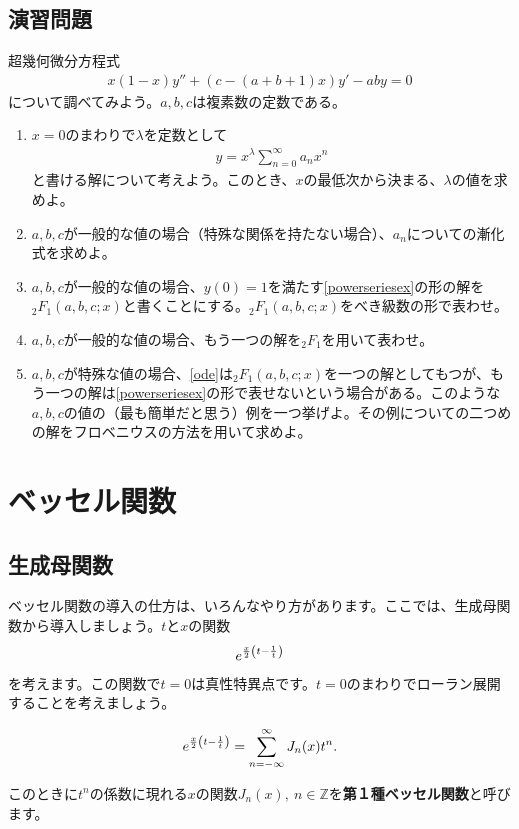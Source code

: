 \documentclass[report,paper=a4, fontsize=12pt, line_length=16cm, number_of_lines=33,dvipdfmx]{jlreq}
\newenvironment{important}{\begin{tcolorbox}[
  colback = white,
  colframe = red!35,
  boxrule = 2mm,
  fonttitle = \bfseries,
  after = \noindent] }{\end{tcolorbox}}
\numberwithin{equation}{section}
\newcommand{\Zb}{\mathbb{Z}}
\newcommand{\strong}[1]{\textsf{\bfseries #1}}
\newcommand{\HG}{{}_2F_1}
\begin{document}
\section{演習問題}\label{ex:hypergeometric}
超幾何微分方程式
\begin{align}
  x(1-x)y'' + \left(c-(a+b+1)x\right)y' - aby=0\tag{＊}
\end{align}
について調べてみよう。$a,b,c$は複素数の定数である。
\begin{enumerate}
  \item $x=0$のまわりで$\lambda$を定数として
        \begin{align}
          y=x^{\lambda}\sum_{n=0}^{\infty}a_{n}x^{n}\tag{♯}
          \label{powerseriesex}
        \end{align}
        と書ける解について考えよう。このとき、$x$の最低次から決まる、$\lambda$の値を求めよ。
  \item $a,b,c$が一般的な値の場合（特殊な関係を持たない場合）、$a_n$についての漸化式を求めよ。
  \item $a,b,c$が一般的な値の場合、$y(0)=1$を満たす\eqref{powerseriesex}の形の解を$\HG(a,b,c;x)$と書くことにする。$\HG(a,b,c;x)$をべき級数の形で表わせ。
  \item $a,b,c$が一般的な値の場合、もう一つの解を$\HG$を用いて表わせ。
  \item $a,b,c$が特殊な値の場合、\eqref{ode}は$\HG(a,b,c;x)$を一つの解としてもつが、もう一つの解は\eqref{powerseriesex}の形で表せないという場合がある。このような$a,b,c$の値の（最も簡単だと思う）例を一つ挙げよ。その例についての二つめの解をフロベニウスの方法を用いて求めよ。 
\end{enumerate}

\chapter{ベッセル関数}
\section{生成母関数}
ベッセル関数の導入の仕方は、いろんなやり方があります。ここでは、生成母関数から導入しましょう。$t$と$x$の関数
\begin{align}
  e^{\frac{x}{2}\qty(t-\frac{1}{t})}
\end{align}
を考えます。この関数で$t=0$は真性特異点です。$t=0$のまわりでローラン展開することを考えましょう。
\begin{important}
  \begin{align}
    e^{\frac{x}{2}\qty(t-\frac{1}{t})}=\sum_{n=-\infty}^{\infty}
    J_n(x)t^{n}.\label{generatingBessel1}
  \end{align}  
\end{important}
このときに$t^n$の係数に現れる$x$の関数$J_n(x), \ n\in \Zb$を\strong{第１種ベッセル関数}と呼びます。
\end{document}
